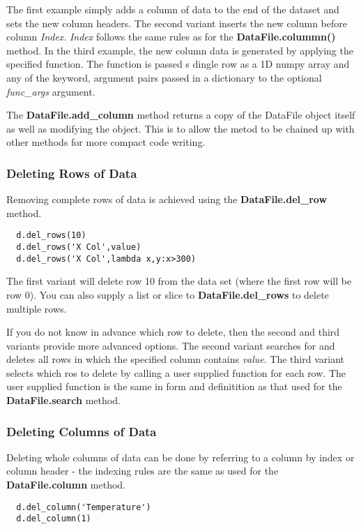 \documentclass[a4paper,11pt]{scrartcl}
\begin{document}
The first example simply adds a column of data to the end of the dataset and
sets the new column headers. The second variant  inserts the new column before
column \textit{Index}. \textit{Index} follows the same rules as for the
\textbf{DataFile.colummn()} method. In the third example, the new column data is
generated by applying the specified function. The function is passed s dingle
row as a 1D numpy array and any of the keyword, argument pairs passed in a
dictionary to the optional \textit{func\_args} argument.

The \textbf{DataFile.add\_column} method returns a copy of the DataFile object
itself as well as modifying the object. This is to allow the metod to be chained
up with other methods for more compact code writing.

\subsubsection{Deleting Rows of Data}

Removing complete rows of data is achieved using the \textbf{DataFile.del\_row}
method.

\begin{lstlisting}
  d.del_rows(10)
  d.del_rows('X Col',value)
  d.del_rows('X Col',lambda x,y:x>300)
\end{lstlisting}

The first variant will delete row 10 from the data set (where the first row will
be row 0). You can also supply a list or slice to \textbf{DataFile.del\_rows} to
delete multiple rows.

If you do not know in advance which row to delete, then the second and third
variants provide more advanced options. The second variant searches for and
deletes all rows in which the specified column contains \textit{value}. The
third variant selects which ros to delete by calling a user supplied function
for each row. The user supplied function is the same in form and definitition as
that used for the \textbf{DataFile.search} method.

\subsubsection{Deleting Columns of Data}

Deleting whole columns of data can be done by referring to a column by index or
column header - the indexing rules are the same as used for the
\textbf{DataFile.column} method.

\begin{lstlisting}
  d.del_column('Temperature')
  d.del_column(1)
\end{lstlisting}
\end{document}
